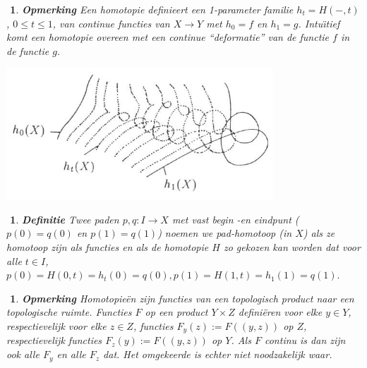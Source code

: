\documentclass[12pt]{book}
\newtheorem{opmh}[stelh]{$\!\!$}
\newtheorem{dfh}[stelh]{$\!\!$}
\newenvironment{eopm}{\begin{opmh} \em {\bf Opmerking }}{\end{opmh}}
\newenvironment{df}{\begin{dfh} \em {\bf Definitie }}{\end{dfh}}
\begin{document}
\begin{eopm}
Een homotopie definieert een 1-parameter familie $h_{t}=H(-,t)$, $0\leq t \leq 1$, van continue
functies van $X\to Y$ met $h_0=f$ en $h_1=g$. 
Intu\"{\i}tief komt een homotopie overeen met een
continue ``deformatie'' van de functie $f$ in de functie $g$.
\end{eopm}

\begin{center}
\includegraphics[width=10cm]{images/homotopie.JPG}
\end{center}

\begin{df}
Twee paden $p,q:I\to X$ met vast begin -en eindpunt ($p(0)=q(0)$ en $p(1)=q(1)$) noemen we {\em pad-homotoop} (in $X$) als ze homotoop zijn als functies en als de homotopie $H$ zo gekozen kan worden dat voor alle $t\in I$, $p(0)=H(0,t)=h_t(0)=q(0), p(1)=H(1,t)=h_1(1)=q(1).$
\end{df}


\begin{eopm}
Homotopie\"en zijn functies van een topologisch product naar een topologische ruimte. Functies $F$ op een product $Y\times Z$ defini\"eren voor elke $y\in Y$, respectievelijk voor elke $z\in Z$, functies $F_y(z):=F((y,z))$ op $Z$, respectievelijk functies $F_z(y):=F((y,z))$ op $Y$. Als $F$ continu is dan zijn ook alle $F_y$ en alle $F_z$ dat. Het omgekeerde is echter niet noodzakelijk waar. 
\end{eopm}
\end{document}

